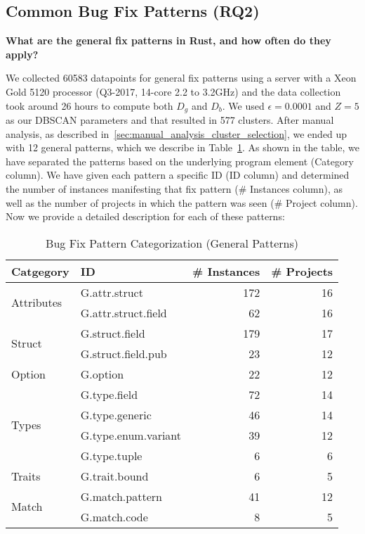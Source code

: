 \subsection{\label{sec:common_patterns}Common Bug Fix Patterns (RQ2)}

\textbf{What are the general fix patterns in Rust, and how often do they apply?} 

We collected 60583 datapoints for general fix patterns using a server with a Xeon Gold 5120 processor (Q3-2017, 14-core 2.2 to 3.2GHz) and the data collection took around 26 hours to compute both $D_g$ and $D_b$. We used $\epsilon=0.0001$ and $Z=5$ as our DBSCAN parameters and that resulted in 577 clusters. After manual analysis, as described in~\ref{sec:manual_analysis_cluster_selection}, we ended up with 12 general patterns, which we describe in Table~\ref{table:general}. As shown in the table, we have separated the patterns based on the underlying program element (Category column). We have given each pattern a specific ID (ID column) and determined the number of instances manifesting that fix pattern (\# Instances column), as well as the number of projects in which the pattern was seen (\# Project column). Now we provide a detailed description for each of these patterns:

\begin{table}[]

\begin{tabular}{l|l|r|r}
\textbf{Catgegory} & \textbf{ID} & \textbf{\# Instances} & \textbf{\# Projects} \\
\hline
\multirow{2}{*}{Attributes} & G.attr.struct & 172 & 16                                  \\
& G.attr.struct.field & 62 & 16                     \\\cline{1-4}
\multirow{2}{*}{Struct} & G.struct.field  & 179 & 17\\
& G.struct.field.pub & 23 & 12   
\\\cline{1-4}
Option & G.option & 22 & 12                    \\\cline{1-4}
\multirow{4}{*}{Types} & G.type.field  & 72 & 14 \\
& G.type.generic & 46 & 14\\ & G.type.enum.variant  & 39 & 12 \\
& G.type.tuple & 6 & 6                                         \\\cline{1-4}
\multirow{1}{*}{Traits} & G.trait.bound & 6 & 5 \\\cline{1-4}
\multirow{2}{*}{Match} & G.match.pattern & 41 & 12 \\
& G.match.code & 8 & 5 \\
\end{tabular}
\caption{\label{table:general}Bug Fix Pattern Categorization (General Patterns)}
\end{table}
    

